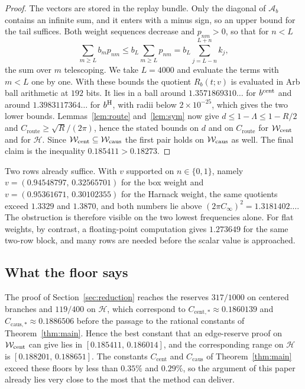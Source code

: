 \documentclass[10pt]{article}
\theoremstyle{remark}
\newcommand{\Cinf}{C_\infty}
\newcommand{\Ccent}{C_{\mathrm{cent}}}
\newcommand{\Ccaus}{C_{\mathrm{caus}}}
\newcommand{\Croute}{C_{\mathrm{route}}}
\begin{document}
\begin{proof}
The vectors are stored in the replay bundle. Only the diagonal of $\mathcal A_b$ contains an infinite sum, and it enters with a minus sign, so an upper bound for the tail suffices. Both weight sequences decrease and $p_{nm}>0$, so that for $n<L$
\[
\sum_{m\ge L}b_mp_{nm}\le b_L\sum_{m\ge L}p_{nm}=b_L\sum_{j=L-n}^{L+n}k_j,
\]
the sum over $m$ telescoping. We take $L=4000$ and evaluate the terms with $m<L$ one by one. With these bounds the quotient $R_b(t;v)$ is evaluated in Arb ball arithmetic at $192$ bits. It lies in a ball around $1.3571869310\ldots$ for $b^{\rm cent}$ and around $1.3983117364\ldots$ for $b^{\rm H}$, with radii below $2\times10^{-25}$, which gives the two lower bounds. Lemmas~\ref{lem:route} and~\ref{lem:sym} now give $d\le1-\Lambda\le1-R/2$ and $\Croute\ge\sqrt R/(2\pi)$, hence the stated bounds on $d$ and on $\Croute$ for $\mathcal W_{\rm cent}$ and for $\mathcal H$. Since $\mathcal W_{\rm cent}\subseteq\mathcal W_{\rm caus}$ the first pair holds on $\mathcal W_{\rm caus}$ as well. The final claim is the inequality $0.185411>0.18273$.
\end{proof}

Two rows already suffice. With $v$ supported on $n\in\{0,1\}$, namely $v=(0.94548797,\,0.32565701)$ for the box weight and $v=(0.95361671,\,0.30102355)$ for the Harnack weight, the same quotients exceed $1.3329$ and $1.3870$, and both numbers lie above $(2\pi\Cinf)^2=1.3181402\ldots$. The obstruction is therefore visible on the two lowest frequencies alone. For flat weights, by contrast, a floating-point computation gives $1.273649$ for the same two-row block, and many rows are needed before the scalar value is approached.

\subsection{What the floor says}

The proof of Section~\ref{sec:reduction} reaches the reserves $317/1000$ on centered branches and $119/400$ on $\mathcal H$, which correspond to $C_{\mathrm{cent},*}\approx0.1860139$ and $C_{\mathrm{caus},*}\approx0.1886506$ before the passage to the rational constants of Theorem~\ref{thm:main}. Hence the best constant that an edge-reserve proof on $\mathcal W_{\rm cent}$ can give lies in $[0.185411,\,0.186014]$, and the corresponding range on $\mathcal H$ is $[0.188201,\,0.188651]$. The constants $\Ccent$ and $\Ccaus$ of Theorem~\ref{thm:main} exceed these floors by less than $0.35\%$ and $0.29\%$, so the argument of this paper already lies very close to the most that the method can deliver.
\end{document}
